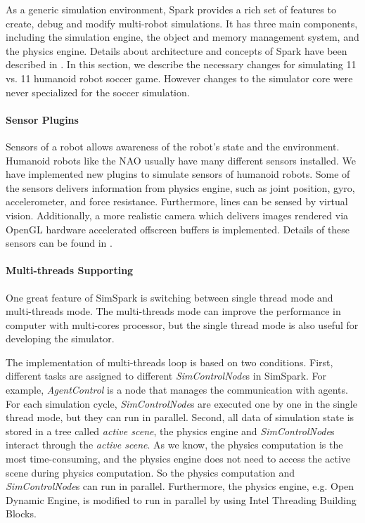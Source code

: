 \documentclass{llncs}
\begin{document}
As a generic simulation environment, Spark provides a rich set of features to create, debug and modify multi-robot simulations.
It has three main components, including the simulation engine, the object and memory management system, and the physics engine. Details about architecture and concepts of Spark have been described in \cite{Boedecker2008,OR05}.
In this section, we describe the necessary changes for simulating 11 vs. 11 humanoid robot soccer game.
However changes to the simulator core were never specialized for the soccer simulation.

\paragraph{Sensor Plugins}
Sensors of a robot allows awareness of the robot's state and the environment.
Humanoid robots like the NAO usually have many different sensors installed.
We have implemented new plugins to simulate sensors of humanoid robots.
Some of the sensors delivers information from physics engine, such as joint position, gyro, accelerometer, and force resistance. Furthermore, lines can be sensed by virtual vision.
Additionally, a more realistic camera which delivers images rendered via OpenGL hardware accelerated offscreen buffers is implemented. Details of these sensors can be found in \cite{usermanual}.

\paragraph{Multi-threads Supporting}
One great feature of SimSpark is switching between single thread mode and multi-threads
mode. The multi-threads mode can improve the performance in computer with multi-cores processor, but the single thread mode is also useful for developing the simulator. 

The implementation of multi-threads loop is based on two conditions.
First, different tasks are assigned to different \textit{SimControlNode}s in SimSpark.
For example, \textit{AgentControl} is a node that manages the communication with agents.
For each simulation cycle, \textit{SimControlNode}s are executed one by one in the single thread mode, but they can run in parallel.
Second, all data of simulation state is stored in a tree called \textit{active scene},
the physics engine and \textit{SimControlNode}s interact through the \textit{active scene}.
As we know, the physics computation is the most time-consuming, and the physics engine does not need to access the active scene during physics computation.
So the physics computation and \textit{SimControlNode}s can run in parallel.
Furthermore, the physics engine, e.g. Open Dynamic Engine\cite{Smith:ODE}, is modified to run in parallel by using Intel Threading Building Blocks\cite{tbb}.
\end{document}
